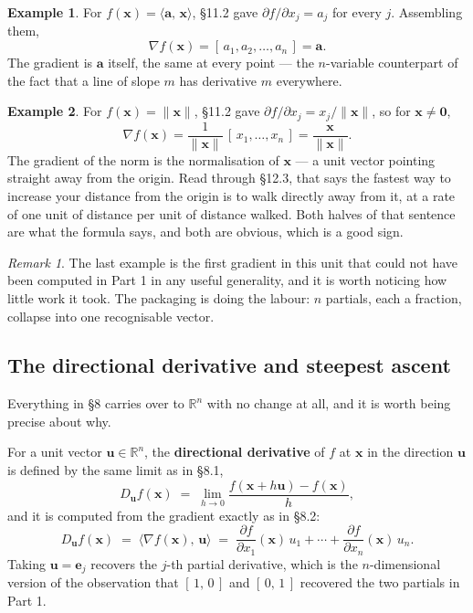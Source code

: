 \documentclass[11pt]{article}
\theoremstyle{plain}
\theoremstyle{definition}
\newtheorem{ex}{Example}[section]
\theoremstyle{remark}
\newtheorem*{rmk}{Remark}
\newcommand{\R}{\mathbb{R}}
\newcommand{\vc}[1]{\mathbf{#1}}
\newcommand{\norm}[1]{\lVert #1\rVert}
\newcommand{\ip}[2]{\langle #1,\, #2\rangle}
\newcommand{\grad}{\nabla}
\newcommand{\pd}[2]{\frac{\partial #1}{\partial #2}}
\begin{document}
\begin{ex}
For $f(\vc{x})=\ip{\vc{a}}{\vc{x}}$, \S11.2 gave $\partial f/\partial x_j=a_j$
for every $j$. Assembling them,
\[
  \grad f(\vc{x}) = [\,a_1,a_2,\dots,a_n\,] = \vc{a} .
\]
The gradient is $\vc{a}$ itself, the same at every point --- the $n$-variable
counterpart of the fact that a line of slope $m$ has derivative $m$ everywhere.
\end{ex}

\begin{ex}
For $f(\vc{x})=\norm{\vc{x}}$, \S11.2 gave $\partial f/\partial x_j =
x_j/\norm{\vc{x}}$, so for $\vc{x}\neq\vc{0}$,
\[
  \grad f(\vc{x})
  = \frac{1}{\norm{\vc{x}}}\,[\,x_1,\dots,x_n\,]
  = \frac{\vc{x}}{\norm{\vc{x}}} .
\]
The gradient of the norm is the normalisation of $\vc{x}$ --- a unit vector
pointing straight away from the origin. Read through \S12.3, that says the
fastest way to increase your distance from the origin is to walk directly away
from it, at a rate of one unit of distance per unit of distance walked. Both
halves of that sentence are what the formula says, and both are obvious, which
is a good sign.
\end{ex}

\begin{rmk}
The last example is the first gradient in this unit that could not have been
computed in Part 1 in any useful generality, and it is worth noticing how little
work it took. The packaging is doing the labour: $n$ partials, each a fraction,
collapse into one recognisable vector.
\end{rmk}

\subsection{The directional derivative and steepest ascent}
Everything in \S8 carries over to $\R^{n}$ with no change at all, and it is worth
being precise about why.

For a unit vector $\vc{u}\in\R^{n}$, the \textbf{directional derivative} of $f$
at $\vc{x}$ in the direction $\vc{u}$ is defined by the same limit as in
\S8.1,
\[
  D_{\vc{u}}f(\vc{x})
  \;=\;
  \lim_{h\to0}\frac{f(\vc{x}+h\vc{u})-f(\vc{x})}{h},
\]
and it is computed from the gradient exactly as in \S8.2:
\[
  D_{\vc{u}}f(\vc{x})
  \;=\; \ip{\grad f(\vc{x})}{\vc{u}}
  \;=\; \pd{f}{x_1}(\vc{x})\,u_1 + \cdots + \pd{f}{x_n}(\vc{x})\,u_n .
\]
Taking $\vc{u}=\vc{e}_j$ recovers the $j$-th partial derivative, which is the
$n$-dimensional version of the observation that $[\,1,\,0\,]$ and $[\,0,\,1\,]$
recovered the two partials in Part 1.
\end{document}
